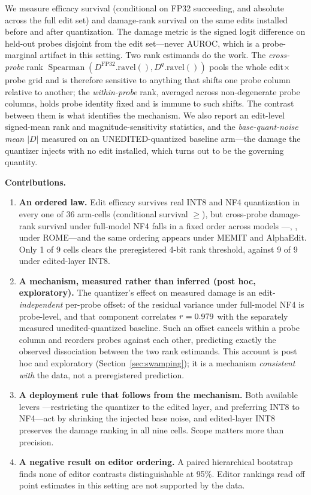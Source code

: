 \documentclass[preprint,12pt]{elsarticle}
\begin{document}
We measure efficacy survival (conditional on FP32 succeeding, and absolute across the
full edit set) and damage-rank survival on the same edits installed before and after
quantization. The damage metric is the signed logit difference on held-out probes
disjoint from the edit set---never AUROC, which is a probe-marginal artifact in this
setting. Two rank estimands do the work. The \emph{cross-probe} rank
$\operatorname{Spearman}(D^{\mathrm{FP32}}.\mathrm{ravel}(), D^{q}.\mathrm{ravel}())$
pools the whole edit${\times}$probe grid and is therefore sensitive to anything that
shifts one probe column relative to another; the \emph{within-probe} rank, averaged
across non-degenerate probe columns, holds probe identity fixed and is immune to such
shifts. The contrast between them is what identifies the mechanism. We also report an
edit-level signed-mean rank and magnitude-sensitivity statistics, and the
\emph{base-quant-noise mean $|D|$} measured on an UNEDITED-quantized baseline arm---the
damage the quantizer injects with no edit installed, which turns out to be the governing
quantity.

\textbf{Contributions.}
\begin{enumerate}
\item \textbf{An ordered law.} Edit efficacy survives real INT8 and NF4 quantization in
every one of 36 arm-cells (conditional survival $\geq$\pMinCondAll{}), but cross-probe
damage-rank survival under full-model NF4 falls in a fixed order across models
---\pFlatNfFMLOneRome{}, \pFlatNfFMLThreeRome{}, \pFlatNfFMQOneRome{} under ROME---and
the same ordering appears under MEMIT and AlphaEdit. Only 1 of 9 cells clears the
preregistered 4-bit rank threshold, against 9 of 9 under edited-layer INT8.
\item \textbf{A mechanism, measured rather than inferred (post hoc, exploratory).} The quantizer's effect on
measured damage is an edit-\emph{independent} per-probe offset:
\pAddShareNfFM{} of the residual variance under full-model NF4 is probe-level, and that
component correlates $r=0.979{}$ with the separately measured unedited-quantized
baseline. Such an offset cancels within a probe column and reorders probes against each
other, predicting exactly the observed dissociation between the two rank estimands.
This account is post hoc and exploratory (Section~\ref{sec:swamping}); it is a mechanism
\emph{consistent with} the data, not a preregistered prediction.
\item \textbf{A deployment rule that follows from the mechanism.} Both available levers
---restricting the quantizer to the edited layer, and preferring INT8 to NF4---act by
shrinking the injected base noise, and edited-layer INT8 preserves the damage ranking in
all nine cells. Scope matters more than precision.
\item \textbf{A negative result on editor ordering.} A paired hierarchical bootstrap
finds none of \pBootNContrasts{} editor contrasts distinguishable at 95\%. Editor
rankings read off point estimates in this setting are not supported by the data.
\end{enumerate}
\end{document}
